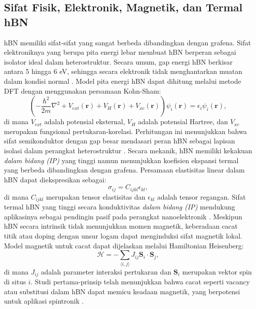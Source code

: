 \subsection{Sifat Fisik, Elektronik, Magnetik, dan Termal hBN}
hBN memiliki sifat-sifat yang sangat berbeda dibandingkan dengan grafena.
Sifat elektroniknya yang berupa pita energi lebar membuat hBN berperan sebagai isolator ideal dalam heterostruktur.
Secara umum, gap energi hBN berkisar antara 5 hingga 6 eV, sehingga secara elektronik tidak menghantarkan muatan dalam kondisi normal \citep{Zhang2020}.
Model pita energi hBN dapat dihitung melalui metode DFT dengan menggunakan persamaan Kohn-Sham:
\begin{equation}
    \left(-\frac{\hbar^2}{2m}\nabla^2 + V_{ext}(\mathbf{r}) + V_H(\mathbf{r}) + V_{xc}(\mathbf{r})\right)\psi_i(\mathbf{r}) = \epsilon_i \psi_i(\mathbf{r}),
\end{equation}
di mana \(V_{ext}\) adalah potensial eksternal, \(V_H\) adalah potensial Hartree, dan \(V_{xc}\) merupakan fungsional pertukaran-korelasi.
Perhitungan ini menunjukkan bahwa sifat semikonduktor dengan gap besar mendasari peran hBN sebagai lapisan isolasi dalam perangkat heterostruktur \citep{Zhang2020}.
Secara mekanik, hBN memiliki kekakuan \emph{dalam bidang (IP)} yang tinggi namun menunjukkan koefisien ekspansi termal yang berbeda dibandingkan dengan grafena.
Persamaan elastisitas linear dalam hBN dapat diekspresikan sebagai:
\begin{equation}
    \sigma_{ij} = C_{ijkl}\epsilon_{kl},
\end{equation}
di mana \(C_{ijkl}\) merupakan tensor elastisitas dan \(\epsilon_{kl}\) adalah tensor regangan.
Sifat termal hBN yang tinggi secara konduktivitas \emph{dalam bidang (IP)} mendukung aplikasinya sebagai pendingin pasif pada perangkat nanoelektronik \citep{Zhang2020}.
Meskipun hBN secara intrinsik tidak menunjukkan momen magnetik, keberadaan cacat titik atau doping dengan unsur logam dapat menginduksi sifat magnetik lokal.
Model magnetik untuk cacat dapat dijelaskan melalui Hamiltonian Heisenberg:
\begin{equation}
    \mathcal{H} = -\sum_{\langle i,j \rangle} J_{ij} \mathbf{S}_i \cdot \mathbf{S}_j,
\end{equation}
di mana \(J_{ij}\) adalah parameter interaksi pertukaran dan \(\mathbf{S}_i\) merupakan vektor spin di situs \(i\).
Studi pertama-prinsip telah menunjukkan bahwa cacat seperti vacancy atau substitusi dalam hBN dapat memicu keadaan magnetik, yang berpotensi untuk aplikasi spintronik \citep{Zhang2020}.

